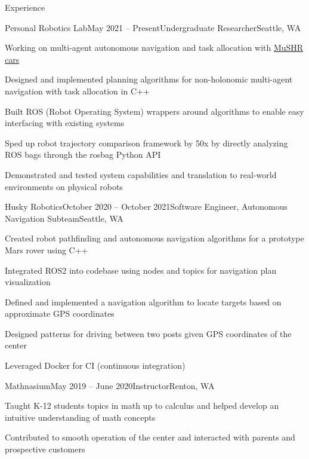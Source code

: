 \documentclass{resume} %
\begin{document}
\begin{rSection}{Experience}

\begin{rSubsection}{Personal Robotics Lab}{May 2021 – Present}{Undergraduate Researcher}{Seattle, WA}
\item Working on multi-agent autonomous navigation and task allocation with \href{https://mushr.io}{MuSHR cars}
\item Designed and implemented planning algorithms for non-holonomic multi-agent navigation with task allocation in C++
\item Built ROS (Robot Operating System) wrappers around algorithms to enable easy interfacing with existing systems
\item Sped up robot trajectory comparison framework by 50x by directly analyzing ROS bags through the rosbag Python API
\item Demonstrated and tested system capabilities and translation to real-world environments on physical robots
\end{rSubsection}

\begin{rSubsection}{Husky Robotics}{October 2020 – October 2021}{Software Engineer, Autonomous Navigation Subteam}{Seattle, WA}
\item Created robot pathfinding and autonomous navigation algorithms for a prototype Mars rover using C++
\item Integrated ROS2 into codebase using nodes and topics for navigation plan visualization
\item Defined and implemented a navigation algorithm to locate targets based on approximate GPS coordinates
\item Designed patterns for driving between two posts given GPS coordinates of the center
\item Leveraged Docker for CI (continuous integration)
\end{rSubsection}

\begin{rSubsection}{Mathnasium}{May 2019 – June 2020}{Instructor}{Renton, WA}
\item Taught K-12 students topics in math up to calculus and helped develop an intuitive understanding of math concepts
\item Contributed to smooth operation of the center and interacted with parents and prospective customers
\end{rSubsection}

\end{rSection}
\end{document}
